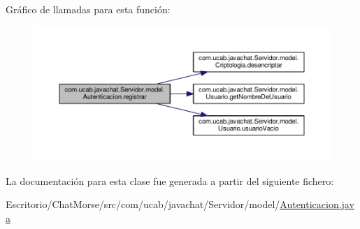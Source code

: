 Gráfico de llamadas para esta función\-:\nopagebreak
\begin{figure}[H]
\begin{center}
\leavevmode
\includegraphics[width=350pt]{classcom_1_1ucab_1_1javachat_1_1_servidor_1_1model_1_1_autenticacion_a14e19bd0d14451bb87fd62bdd74b15d7_cgraph}
\end{center}
\end{figure}




La documentación para esta clase fue generada a partir del siguiente fichero\-:\begin{DoxyCompactItemize}
\item 
Escritorio/\-Chat\-Morse/src/com/ucab/javachat/\-Servidor/model/\hyperlink{_autenticacion_8java}{Autenticacion.\-java}\end{DoxyCompactItemize}
